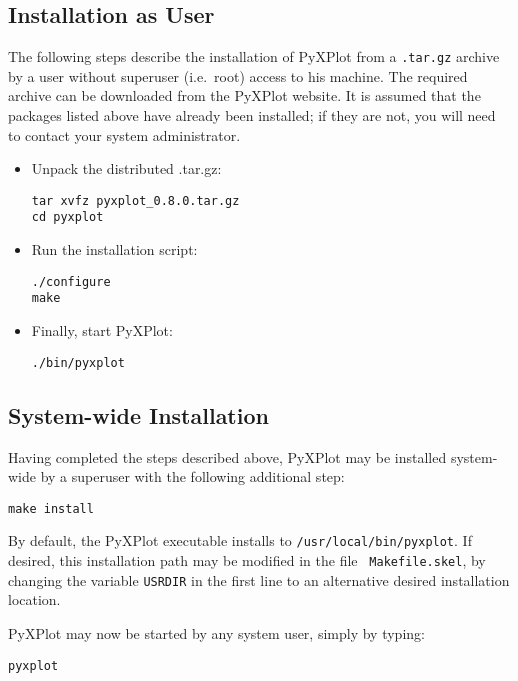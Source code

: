 \subsection{Installation as User}

The following steps describe the installation of PyXPlot from a {\tt .tar.gz}
archive by a user without superuser (i.e.\ root) access to his machine. The
required archive can be downloaded from the PyXPlot website. It is assumed that
the packages listed above have already been installed; if they are not, you
will need to contact your system administrator.

\begin{itemize}
\item Unpack the distributed .tar.gz:

\begin{verbatim}
tar xvfz pyxplot_0.8.0.tar.gz
cd pyxplot
\end{verbatim}

\item Run the installation script:

\begin{verbatim}
./configure
make
\end{verbatim}

\item Finally, start PyXPlot:

\begin{verbatim}
./bin/pyxplot
\end{verbatim}

\end{itemize}

\subsection{System-wide Installation}

Having completed the steps described above, PyXPlot may be installed
system-wide by a superuser with the following additional
step:

\begin{verbatim}
make install
\end{verbatim}

By default, the PyXPlot executable installs to {\tt /usr/local/bin/pyxplot}.
If desired, this installation path may be modified in the file {\tt
Makefile.skel}, by changing the variable {\tt USRDIR} in the first line to an
alternative desired installation location.

PyXPlot may now be started by any system user, simply by typing:

\begin{verbatim}
pyxplot
\end{verbatim}

